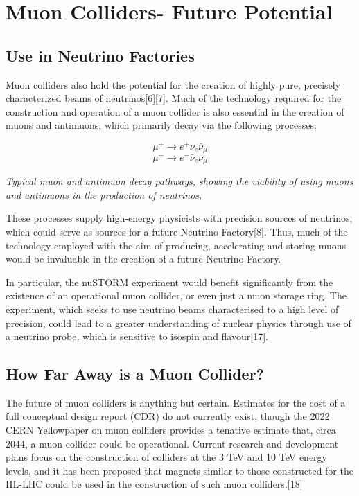 \documentclass{article}
\begin{document}
	\section{Muon Colliders- Future Potential}
	
	\subsection{Use in Neutrino Factories}
	\par Muon colliders also hold the potential for the creation of highly pure, precisely characterized beams of neutrinos[6][7]. Much of the technology required for the construction and operation of a muon collider is also essential in the creation of muons and antimuons, which primarily decay via the following processes:
	
	$$\mu^+\rightarrow e^+ \nu_e \bar{\nu}_\mu$$
	$$\mu^-\rightarrow e^- \bar{\nu}_e \nu_\mu$$
	
	\begin{center}
		\par \textit{Typical muon and antimuon decay pathways, showing the viability of using muons and antimuons in the production of neutrinos.}
	\end{center}
	
	\par These processes supply high-energy physicists with precision sources of neutrinos, which could serve as sources for a future Neutrino Factory[8]. Thus, much of the technology employed with the aim of producing, accelerating and storing muons would be invaluable in the creation of a future Neutrino Factory.
	
	\par In particular, the nuSTORM experiment would benefit significantly from the existence of an operational muon collider, or even just a muon storage ring. The experiment, which seeks to use neutrino beams characterised to a high level of precision, could lead to a greater understanding of nuclear physics through use of a neutrino probe, which is sensitive to isospin and flavour[17].
	
	\subsection{How Far Away is a Muon Collider?}
	\par The future of muon colliders is anything but certain. Estimates for the cost of a full conceptual design report (CDR) do not currently exist, though the 2022 CERN Yellowpaper on muon colliders provides a tenative estimate that, circa 2044, a muon collider could be operational. Current research and development plans focus on the construction of colliders at the 3 TeV and 10 TeV energy levels, and it has been proposed that magnets similar to those constructed for the HL-LHC could be used in the construction of such muon colliders.[18] 
	
\end{document}
